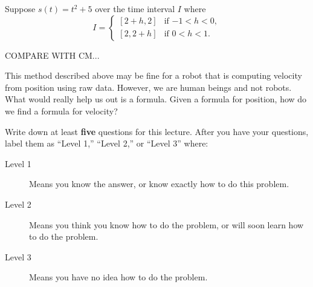 \documentclass{ximera}
\begin{document}
Suppose $s(t) = t^2 + 5$ over the time interval $I$ where
\[
I = 
\begin{cases}
[2+h,2]  & \text{if $-1<h<0$}, \\ %
[2,2+h]  & \text{if $0<h<1$}. %
\end{cases}
\]


COMPARE WITH CM...


\begin{question}
This method described above may be fine for a robot that is computing
velocity from position using raw data. However, we are human beings
and not robots. What would really help us out is a formula. Given a
formula for position, how do we find a formula for velocity?
\end{question}











\begin{xarmaBoost}
Write down at least \textbf{five} questions for this lecture. After
you have your questions, label them as ``Level 1,'' ``Level 2,'' or ``Level 3'' where:
\begin{description}
\item[Level 1] Means you know the answer, or know exactly how to do this problem.
\item[Level 2] Means you think you know how to do the problem, or will soon learn how to do the problem.
\item[Level 3] Means you have no idea how to do the problem. 
\end{description}
  \begin{freeResponse}
  \end{freeResponse}
\end{xarmaBoost}
\end{document}
